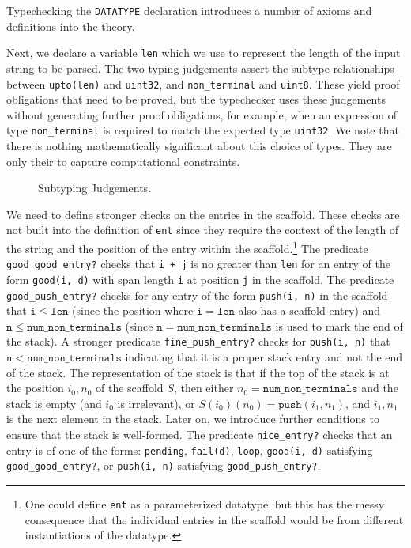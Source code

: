\documentclass[sigplan,10pt,anonymous,review]{acmart}\settopmatter{printfolios=true,printccs=false,printacmref=false}
\begin{document}
\begin{CCSXML}
Typechecking the \texttt{DATATYPE} declaration introduces a number of
axioms and definitions into the theory.

Next, we declare a variable \texttt{len} which we use to represent the length
of the input string to be parsed.  The two typing judgements assert the
subtype relationships between \texttt{upto(len)} and \texttt{uint32},
and \texttt{non\_terminal} and \texttt{uint8}\@.  These yield proof
obligations that need to be proved, but the typechecker uses these
judgements without generating further proof obligations, for example,
when an expression of type \texttt{non\_terminal} is required to match
the expected type \texttt{uint32}\@.  We note that there is nothing
mathematically significant about this choice of types.  They are only their
to capture computational constraints.
\begin{figure}[h!]
			
			\caption{Subtyping Judgements.}
			\label{pvs:judgements}
\end{figure}

We need to define stronger checks on the entries in the scaffold.
These checks are not built into the definition of \texttt{ent} since
they require the context of the length of the string and the position
of the entry within the scaffold.\footnote{One could define \texttt{ent} as a
  parameterized datatype, but this has the messy consequence that
   the individual entries in the scaffold would
be from different instantiations of the datatype. }
The predicate \texttt{good\_good\_entry?} checks that
 \texttt{i + j} is no greater than \texttt{len} 
for an entry of the form \texttt{good(i, d)} with span length \texttt{i}
at position \texttt{j} in the scaffold.  The predicate \texttt{good\_push\_entry?}
checks for any entry of the form \texttt{push(i, n)} in the scaffold
that $\mathtt{i} \leq \mathtt{len}$ (since the position where $\mathtt{i} = \mathtt{len}$ also has a scaffold entry) 
and $ \mathtt{n}\leq \mathtt{num\_non\_terminals}$ (since $\mathtt{n} = \mathtt{num\_non\_terminals}$ is used to mark the end of the stack).  A stronger predicate
\texttt{fine\_push\_entry?} checks for \texttt{push(i, n)} that $\mathtt{n} < \mathtt{num\_non\_terminals}$ indicating that it is a proper stack entry and not the
end of the stack.  The representation of the stack is that if the
top of the stack is at the position $i_0, n_0$ of the scaffold $S$, then
either $n_0 = \mathtt{num\_non\_terminals}$ and the stack is empty
(and $i_0$ is irrelevant), or $S(i_0)(n_0) = \mathtt{push}(i_1, n_1)$, and
$i_1, n_1$ is the next element in the stack.  Later on, we introduce further conditions
to ensure that the stack is well-formed.  The predicate \texttt{nice\_entry?}
checks that an entry is of one of the forms:
\texttt{pending}, \texttt{fail(d)}, \texttt{loop},
\texttt{good(i, d)} satisfying \texttt{good\_good\_entry?}, or
\texttt{push(i, n)} satisfying \texttt{good\_push\_entry?}.


\end{CCSXML}
\end{document}
